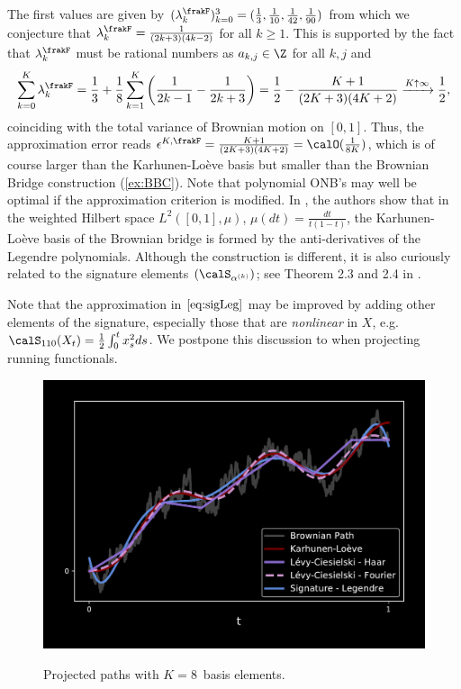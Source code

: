 The first values are given by $(\lambda^{\frakF}_k)_{k=0}^3 = (\frac{1}{3},\frac{1}{10}, \frac{1}{42}, \frac{1}{90})$ from which we  conjecture that $\lambda^{\frakF}_k = \frac{1}{(2k+3)(4k-2)}$ for all $k\ge 1$. This is supported by the fact that $\lambda^{\frakF}_k$ must be  rational numbers as $a_{k,j}\in \Z$ for all $k,j$ and 
$$\sum_{k=0}^K  \lambda^{\frakF}_k = \frac{1}{3} + \frac{1}{8} \sum_{k=1}^K  \left( \frac{1}{2k-1}-\frac{1}{2k+3} \right) = \frac{1}{2} - \frac{K+1}{(2K+3)(4K+2)} \xrightarrow{K \uparrow \infty} \frac{1}{2},$$ coinciding with the total variance of Brownian motion on $[0,1]$.  
Thus, the approximation error reads  $\epsilon^{K, \frakF} =\frac{K+1}{(2K+3)(4K+2)} = \calO(\frac{1}{8K})$, which is of course larger than the Karhunen-Loève basis but smaller than the Brownian Bridge construction (\cref{ex:BBC}). Note that polynomial ONB's may well be optimal if the approximation criterion is modified. In \cite{Foster}, the authors show that in the weighted Hilbert space $L^2([0,1],\mu)$, $\mu(dt) = \frac{dt}{t(1-t)}$, the Karhunen-Loève basis of the Brownian bridge is formed by the anti-derivatives of the Legendre polynomials. Although the construction is different, it  is also curiously related to the signature elements $(\calS_{\alpha^{(k)}})$; see  Theorem 2.3 and  2.4 in \cite{Foster}.


\begin{remark}
Note that the approximation in $\eqref{eq:sigLeg}$ may be improved by adding other elements of the  signature, especially those that are \textit{nonlinear} in $X$, e.g. $\calS_{110}(X_t) = \frac{1}{2}\int_0^t x^2_s ds $.  We postpone this discussion to   when projecting  running functionals.
\end{remark} 
 
 \begin{figure}[t]
    \centering
    \caption{Projected paths with $K=8\,$ basis elements. }
    \vspace{-2mm}
    \includegraphics[scale = 0.45
    ]{KL/Figures/ProjPath.pdf}
    \label{fig:projPath}
\end{figure}